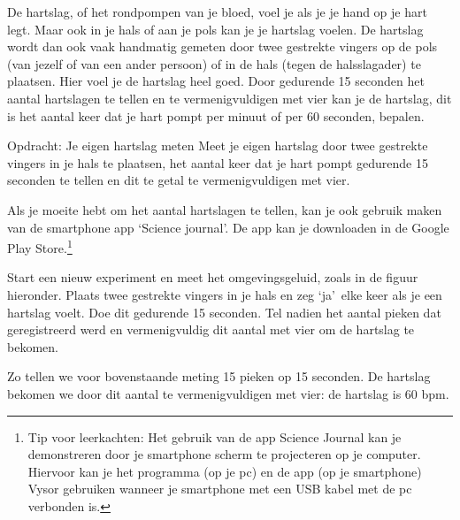 De hartslag, of het rondpompen van je bloed, voel je als je je hand op je hart legt. Maar ook in je hals of aan je pols kan je je hartslag voelen. De hartslag wordt dan ook vaak handmatig gemeten door twee gestrekte vingers op de pols (van jezelf of van een ander persoon) of in de hals (tegen de halsslagader) te plaatsen. Hier voel je de hartslag heel goed. Door gedurende 15 seconden het aantal hartslagen te tellen en te vermenigvuldigen met vier kan je de hartslag, dit is het aantal keer dat je hart pompt per minuut of per 60 seconden, bepalen.

\begin{opdracht}{Opdracht: Je eigen hartslag meten}
	Meet je eigen hartslag door twee gestrekte vingers in je hals te plaatsen, het aantal keer dat je hart pompt gedurende 15 seconden te tellen en dit te getal te vermenigvuldigen met vier.
	
	Als je moeite hebt om het aantal hartslagen te tellen, kan je ook gebruik maken van de smartphone app \textquoteleft Science journal\textquoteright. De app kan je downloaden in de Google Play Store.\footnote{Tip voor leerkachten:
	Het gebruik van de app Science Journal kan je demonstreren door je smartphone scherm te projecteren op je computer. Hiervoor kan je het programma (op je pc) en de app (op je smartphone) Vysor gebruiken wanneer je smartphone met een USB kabel met de pc verbonden is.}
	
	Start een nieuw experiment en meet het omgevingsgeluid, zoals in de figuur hieronder. Plaats twee gestrekte vingers in je hals en zeg \textquoteleft ja\textquoteright \ elke keer als je een hartslag voelt. Doe dit gedurende 15 seconden. Tel nadien het aantal pieken dat geregistreerd werd en vermenigvuldig dit aantal met vier om de hartslag te bekomen.
	
	\begin{minipage}{.5\linewidth}
	\end{minipage}
	\begin{minipage}{.5\linewidth}
	\end{minipage}

	Zo tellen we voor bovenstaande meting 15 pieken op 15 seconden. De hartslag bekomen we door dit aantal te vermenigvuldigen met vier: de hartslag is 60 bpm.

\end{opdracht}

